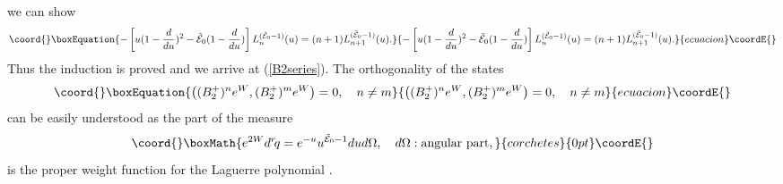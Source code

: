 \documentclass[a4paper,12pt]{article}
\begin{document}
we can show
\begin{equation}\coord{}\boxEquation{
   -\left[u(1-{d\over{du}})^2-\tilde{\cal E}_0(1-{d\over{du}})
   \right]L_n^{(\tilde{\cal
   E}_0-1)}(u)=(n+1)L_{n+1}^{(\tilde{\cal E}_0-1)}(u).
}{
   -\left[u(1-{d\over{du}})^2-\tilde{\cal E}_0(1-{d\over{du}})
   \right]L_n^{(\tilde{\cal
   E}_0-1)}(u)=(n+1)L_{n+1}^{(\tilde{\cal E}_0-1)}(u).
}{ecuacion}\coordE{}\end{equation}
Thus the induction is proved and we arrive at (\ref{B2series}).
The orthogonality of the states
\begin{equation}\coord{}\boxEquation{
   \left((B_2^+)^ne^W,(B_2^+)^me^W\right)=0,\quad n\neq m
}{
   \left((B_2^+)^ne^W,(B_2^+)^me^W\right)=0,\quad n\neq m
}{ecuacion}\coordE{}\end{equation}
can be easily understood as the \coordHE{} part of the measure
\[\coord{}\boxMath{
   e^{2W}d^r\!q= e^{-u}u^{\tilde{\cal E}_0-1}dud\Omega,
   \quad d\Omega: \mbox{angular
   part},
}{corchetes}{0pt}\coordE{}\]
is the proper weight function for the Laguerre polynomial
\coordHE{}.
\end{document}
